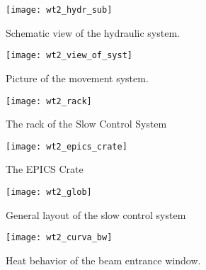 %
\begin{figure}
\begin{center}\texttt{[image: wt2\_hydr\_sub]}\end{center}


\caption{Schematic view of the hydraulic system.}

\label{fig:wt_acqua}
\end{figure}


%
\begin{figure}
\begin{center}\texttt{[image: wt2\_view\_of\_syst]}\end{center}


\caption{Picture of the movement system.}

\label{fig:wt_total-view}
\end{figure}


%
\begin{figure}
\begin{center}\texttt{[image: wt2\_rack]}\end{center}


\caption{The rack of the Slow Control System}

\label{fig:wt_rack}
\end{figure}


%
\begin{figure}
\begin{center}\texttt{[image: wt2\_epics\_crate]}\end{center}


\caption{The EPICS Crate}

\label{fig:wt_crate}
\end{figure}


%
\begin{figure}
\begin{center}\texttt{[image: wt2\_glob]}\end{center}


\caption{General layout of the slow control system}

\label{fig:wt_fig1}
\end{figure}


%
\begin{figure}
\begin{center}\texttt{[image: wt2\_curva\_bw]}\end{center}


\caption{Heat behavior of the beam entrance window.}

\label{fig:wt_curva}
\end{figure}


